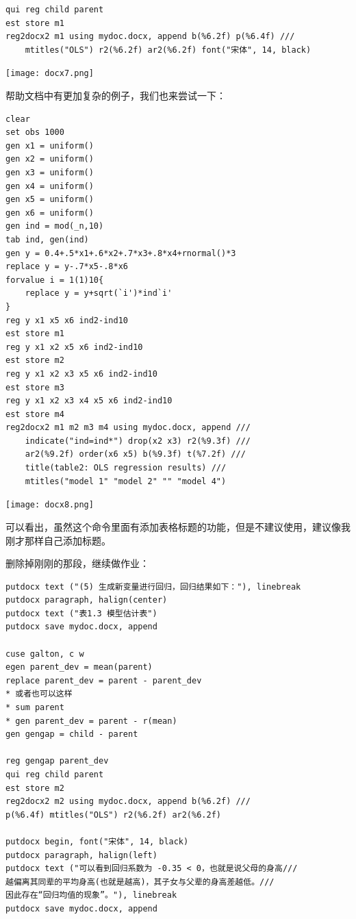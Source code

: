 \documentclass[cn,fancy,blue,11pt]{elegantbook}
\begin{document}
\begin{lstlisting}
qui reg child parent
est store m1
reg2docx2 m1 using mydoc.docx, append b(%6.2f) p(%6.4f) ///
    mtitles("OLS") r2(%6.2f) ar2(%6.2f) font("宋体", 14, black)
\end{lstlisting}

\noindent\texttt{[image: docx7.png]}

帮助文档中有更加复杂的例子，我们也来尝试一下：

\begin{lstlisting}
clear
set obs 1000
gen x1 = uniform()
gen x2 = uniform()
gen x3 = uniform()
gen x4 = uniform()
gen x5 = uniform()
gen x6 = uniform()
gen ind = mod(_n,10)
tab ind, gen(ind)
gen y = 0.4+.5*x1+.6*x2+.7*x3+.8*x4+rnormal()*3
replace y = y-.7*x5-.8*x6
forvalue i = 1(1)10{
    replace y = y+sqrt(`i')*ind`i'
}
reg y x1 x5 x6 ind2-ind10
est store m1
reg y x1 x2 x5 x6 ind2-ind10
est store m2
reg y x1 x2 x3 x5 x6 ind2-ind10
est store m3
reg y x1 x2 x3 x4 x5 x6 ind2-ind10
est store m4
reg2docx2 m1 m2 m3 m4 using mydoc.docx, append ///
    indicate("ind=ind*") drop(x2 x3) r2(%9.3f) ///
    ar2(%9.2f) order(x6 x5) b(%9.3f) t(%7.2f) ///
    title(table2: OLS regression results) ///
    mtitles("model 1" "model 2" "" "model 4")
\end{lstlisting}

\noindent\texttt{[image: docx8.png]}

可以看出，虽然这个命令里面有添加表格标题的功能，但是不建议使用，建议像我刚才那样自己添加标题。

删除掉刚刚的那段，继续做作业：

\begin{lstlisting}
putdocx text ("(5) 生成新变量进行回归，回归结果如下："), linebreak
putdocx paragraph, halign(center)
putdocx text ("表1.3 模型估计表")
putdocx save mydoc.docx, append

cuse galton, c w
egen parent_dev = mean(parent)
replace parent_dev = parent - parent_dev
* 或者也可以这样
* sum parent
* gen parent_dev = parent - r(mean)
gen gengap = child - parent

reg gengap parent_dev
qui reg child parent
est store m2
reg2docx2 m2 using mydoc.docx, append b(%6.2f) ///
p(%6.4f) mtitles("OLS") r2(%6.2f) ar2(%6.2f)

putdocx begin, font("宋体", 14, black)
putdocx paragraph, halign(left)
putdocx text ("可以看到回归系数为 -0.35 < 0，也就是说父母的身高///
越偏离其同辈的平均身高(也就是越高)，其子女与父辈的身高差越低。///
因此存在“回归均值的现象”。"), linebreak
putdocx save mydoc.docx, append
\end{lstlisting}
\end{document}
